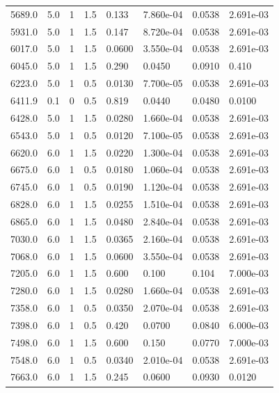 \documentclass[preview]{standalone}
\begin{document}
{{{\begin{tabular}{L{1.2cm}C{1.2cm} C{0.3cm}C{0.5cm} C{1.4cm}C{1.4cm} C{1.4cm}C{1.4cm}}
  5689.0  &   5.0  & 1     & 1.5 &  0.133  & 7.860e-04  & 0.0538 &  2.691e-03   \\ 
  5931.0  &   5.0  & 1     & 1.5 &  0.147  & 8.720e-04  & 0.0538 &  2.691e-03   \\ 
  6017.0  &   5.0  & 1     & 1.5 &  0.0600  & 3.550e-04  & 0.0538 &  2.691e-03   \\ 
  6045.0  &   5.0  & 1     & 1.5 &  0.290  & 0.0450  & 0.0910 &  0.410   \\ 
  6223.0  &   5.0  & 1     & 0.5 &  0.0130  & 7.700e-05  & 0.0538 &  2.691e-03   \\ 
  6411.9  &   0.1  & 0     & 0.5 &  0.819  & 0.0440  & 0.0480 &  0.0100   \\ 
  6428.0  &   5.0  & 1     & 1.5 &  0.0280  & 1.660e-04  & 0.0538 &  2.691e-03   \\ 
  6543.0  &   5.0  & 1     & 0.5 &  0.0120  & 7.100e-05  & 0.0538 &  2.691e-03   \\ 
  6620.0  &   6.0  & 1     & 1.5 &  0.0220  & 1.300e-04  & 0.0538 &  2.691e-03   \\ 
  6675.0  &   6.0  & 1     & 0.5 &  0.0180  & 1.060e-04  & 0.0538 &  2.691e-03   \\ 
  6745.0  &   6.0  & 1     & 0.5 &  0.0190  & 1.120e-04  & 0.0538 &  2.691e-03   \\ 
  6828.0  &   6.0  & 1     & 1.5 &  0.0255  & 1.510e-04  & 0.0538 &  2.691e-03   \\ 
  6865.0  &   6.0  & 1     & 1.5 &  0.0480  & 2.840e-04  & 0.0538 &  2.691e-03   \\ 
  7030.0  &   6.0  & 1     & 1.5 &  0.0365  & 2.160e-04  & 0.0538 &  2.691e-03   \\ 
  7068.0  &   6.0  & 1     & 1.5 &  0.0600  & 3.550e-04  & 0.0538 &  2.691e-03   \\ 
  7205.0  &   6.0  & 1     & 1.5 &  0.600  & 0.100  & 0.104 &  7.000e-03   \\ 
  7280.0  &   6.0  & 1     & 1.5 &  0.0280  & 1.660e-04  & 0.0538 &  2.691e-03   \\ 
  7358.0  &   6.0  & 1     & 0.5 &  0.0350  & 2.070e-04  & 0.0538 &  2.691e-03   \\ 
  7398.0  &   6.0  & 1     & 0.5 &  0.420  & 0.0700  & 0.0840 &  6.000e-03   \\ 
  7498.0  &   6.0  & 1     & 1.5 &  0.600  & 0.150  & 0.0770 &  7.000e-03   \\ 
  7548.0  &   6.0  & 1     & 0.5 &  0.0340  & 2.010e-04  & 0.0538 &  2.691e-03   \\ 
  7663.0  &   6.0  & 1     & 1.5 &  0.245  & 0.0600  & 0.0930 &  0.0120   \\ 

\end{tabular}}}}
\end{document}
